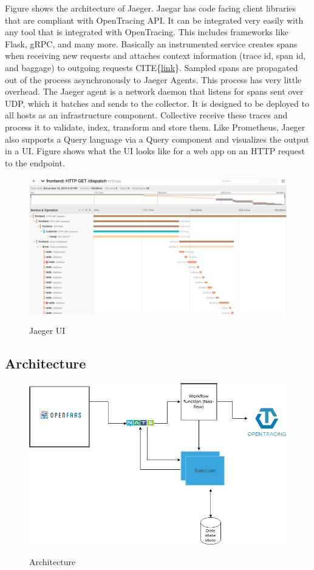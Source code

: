 \documentclass[12pt,titlepage]{article}
\begin{document}
Figure shows the architecture of Jaeger. Jaegar has code facing client libraries
that are compliant with OpenTracing API. It can be integrated very easily with
any tool that is integrated with OpenTracing. This includes frameworks like
Flask, gRPC, and many more. Basically an instrumented service creates spans when
receiving new requests and attaches context information (trace id, span id, and
baggage) to outgoing requests CITE\{\href{https://www.jaegertracing.io/docs/1.14/architecture/}{link}\}. Sampled spans are propagated out of
the process asynchronously to Jaeger Agents. This process has very little
overhead. The Jaeger agent is a network daemon that listens for spans sent over
UDP, which it batches and sends to the collector. It is designed to be deployed
to all hosts as an infrastructure component. Collective receive these traces and
process it to validate, index, transform and store them. Like Prometheus, Jaeger
also supports a Query language via a Query component and visualizes the output
in a UI. Figure shows what the UI looks like for a web app on an HTTP request to
the endpoint. 
\begin{figure}[!h]
    \caption{Jaeger UI}
    \centering
    \includegraphics[width=130mm]{./thesis_images/jaeger_traces.png}
    \label{fig:jaeger_traces}
\end{figure}

\subsection{Architecture}
\label{sec:orgdba302d}
\begin{figure}[!h]
    \caption{Architecture}
    \centering
    \includegraphics[width=130mm]{./thesis_images/architecture.png}
    \label{fig:arch}
\end{figure}
\end{document}
